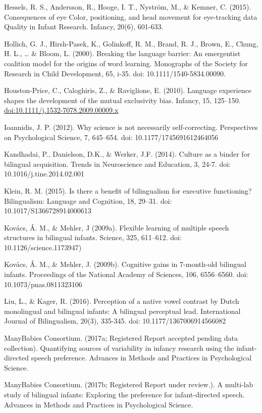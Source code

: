 \documentclass[,man,floatsintext]{apa6}
\begin{document}
Hessels, R. S., Andersson, R., Hooge, I. T., Nyström, M., \& Kemner, C. (2015). Consequences of eye Color, positioning, and head movement for eye‐tracking data Quality in Infant Research. Infancy, 20(6), 601-633.

Hollich, G. J., Hirsh-Pasek, K., Golinkoff, R. M., Brand, R. J., Brown, E., Chung, H. L., \ldots{} \& Bloom, L. (2000). Breaking the language barrier: An emergentist coalition model for the origins of word learning. Monographs of the Society for Research in Child Development, 65, i-35. doi: 10.1111/1540-5834.00090.

Houston-Price, C., Caloghiris, Z., \& Raviglione, E. (2010). Language experience shapes the development of the mutual exclusivity bias. Infancy, 15, 125--150. \url{doi:10.1111/j.1532-7078.2009.00009.x}

Ioannidis, J. P. (2012). Why science is not necessarily self-correcting. Perspectives on Psychological Science, 7, 645--654. doi: 10.1177/1745691612464056

Kandhadai, P., Danielson, D.K., \& Werker, J.F. (2014). Culture as a binder for bilingual acquisition. Trends in Neuroscience and Education, 3, 24-7. doi: 10.1016/j.tine.2014.02.001

Klein, R. M. (2015). Is there a benefit of bilingualism for executive functioning? Bilingualism: Language and Cognition, 18, 29--31. doi: 10.1017/S1366728914000613

Kovács, Á. M., \& Mehler, J (2009a). Flexible learning of multiple speech structures in bilingual infants. Science, 325, 611--612. doi: 10.1126/science.1173947)

Kovács, Á. M., \& Mehler, J. (2009b). Cognitive gains in 7-month-old bilingual infants. Proceedings of the National Academy of Sciences, 106, 6556--6560. doi: 10.1073/pnas.0811323106

Liu, L., \& Kager, R. (2016). Perception of a native vowel contrast by Dutch monolingual and bilingual infants: A bilingual perceptual lead. International Journal of Bilingualism, 20(3), 335-345. doi: 10.1177/1367006914566082

ManyBabies Consortium. (2017a; Registered Report accepted pending data collection). Quantifying sources of variability in infancy research using the infant-directed speech preference. Advances in Methods and Practices in Psychological Science.

ManyBabies Consortium. (2017b; Registered Report under review.). A multi-lab study of bilingual infants: Exploring the preference for infant-directed speech. Advances in Methods and Practices in Psychological Science.
\end{document}
